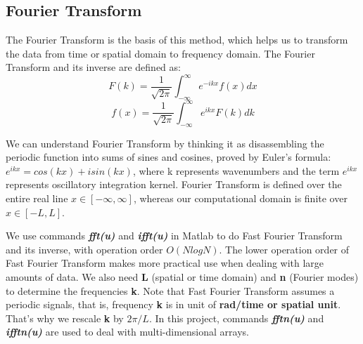 \documentclass[10pt]{article}
\begin{document}
\subsection{Fourier Transform}
The Fourier Transform is the basis of this method, which helps us to transform the data from time or spatial domain to frequency domain. The Fourier Transform and its inverse are defined as:
\begin{equation}\label{1}
F(k) = \frac{1}{\sqrt{2\pi}} \int_{-\infty}^{\infty} e^{-ikx}f(x) dx
\end{equation}
\begin{equation}\label{2}
f(x) = \frac{1}{\sqrt{2\pi}} \int_{-\infty}^{\infty} e^{ikx}F(k) dk 
\end{equation}\par
We can understand Fourier Transform by thinking it as disassembling the periodic function into sums of sines and cosines, proved by Euler's formula: $e^{ikx} = cos(kx) + isin(kx)$, where k represents wavenumbers and the term $e^{ikx}$ represents oscillatory integration kernel. Fourier Transform is defined over the entire real line $x\in[{-\infty},{\infty}]$, whereas our computational domain is finite over $x\in[-L,L]$. \par
\vskip 0.5cm
We use commands \textbf{\emph{fft(u)}} and \textbf{\emph{ifft(u)}} in Matlab to do Fast Fourier Transform and its inverse, with operation order $O(NlogN)$. The lower operation order of Fast Fourier Transform makes more practical use when dealing with large amounts of data. We also need \textbf{L} (spatial or time domain) and \textbf{n}  (Fourier modes) to determine the frequencies \textbf{k}. Note that Fast Fourier Transform assumes a periodic signals, that is, frequency \textbf{k} is in unit of \textbf{rad/time or spatial unit}. That's why we rescale \textbf{k} by $2{\pi}/L$. In this project, commands \textbf{\emph{fftn(u)}} and \textbf{\emph{ifftn(u)}} are used to deal with multi-dimensional arrays.
\end{document}

